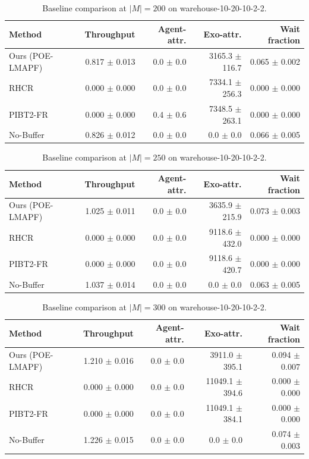\begin{table}[t]
\centering
\small
\begin{tabular}{lrrrr}
\toprule
Method & Throughput & Agent-attr. & Exo-attr. & Wait fraction \\
\midrule
Ours (POE-LMAPF) & 0.817 $\pm$ 0.013 & 0.0 $\pm$ 0.0 & 3165.3 $\pm$ 116.7 & 0.065 $\pm$ 0.002 \\
RHCR & 0.000 $\pm$ 0.000 & 0.0 $\pm$ 0.0 & 7334.1 $\pm$ 256.3 & 0.000 $\pm$ 0.000 \\
PIBT2-FR & 0.000 $\pm$ 0.000 & 0.4 $\pm$ 0.6 & 7348.5 $\pm$ 263.1 & 0.000 $\pm$ 0.000 \\
No-Buffer & 0.826 $\pm$ 0.012 & 0.0 $\pm$ 0.0 & 0.0 $\pm$ 0.0 & 0.066 $\pm$ 0.005 \\
\bottomrule
\end{tabular}
\caption{Baseline comparison at $|M|=200$ on warehouse-10-20-10-2-2.}
\label{tab:baselines_200}
\end{table}

\begin{table}[t]
\centering
\small
\begin{tabular}{lrrrr}
\toprule
Method & Throughput & Agent-attr. & Exo-attr. & Wait fraction \\
\midrule
Ours (POE-LMAPF) & 1.025 $\pm$ 0.011 & 0.0 $\pm$ 0.0 & 3635.9 $\pm$ 215.9 & 0.073 $\pm$ 0.003 \\
RHCR & 0.000 $\pm$ 0.000 & 0.0 $\pm$ 0.0 & 9118.6 $\pm$ 432.0 & 0.000 $\pm$ 0.000 \\
PIBT2-FR & 0.000 $\pm$ 0.000 & 0.0 $\pm$ 0.0 & 9118.6 $\pm$ 420.7 & 0.000 $\pm$ 0.000 \\
No-Buffer & 1.037 $\pm$ 0.014 & 0.0 $\pm$ 0.0 & 0.0 $\pm$ 0.0 & 0.063 $\pm$ 0.005 \\
\bottomrule
\end{tabular}
\caption{Baseline comparison at $|M|=250$ on warehouse-10-20-10-2-2.}
\label{tab:baselines_250}
\end{table}

\begin{table}[t]
\centering
\small
\begin{tabular}{lrrrr}
\toprule
Method & Throughput & Agent-attr. & Exo-attr. & Wait fraction \\
\midrule
Ours (POE-LMAPF) & 1.210 $\pm$ 0.016 & 0.0 $\pm$ 0.0 & 3911.0 $\pm$ 395.1 & 0.094 $\pm$ 0.007 \\
RHCR & 0.000 $\pm$ 0.000 & 0.0 $\pm$ 0.0 & 11049.1 $\pm$ 394.6 & 0.000 $\pm$ 0.000 \\
PIBT2-FR & 0.000 $\pm$ 0.000 & 0.0 $\pm$ 0.0 & 11049.1 $\pm$ 384.1 & 0.000 $\pm$ 0.000 \\
No-Buffer & 1.226 $\pm$ 0.015 & 0.0 $\pm$ 0.0 & 0.0 $\pm$ 0.0 & 0.074 $\pm$ 0.003 \\
\bottomrule
\end{tabular}
\caption{Baseline comparison at $|M|=300$ on warehouse-10-20-10-2-2.}
\label{tab:baselines_300}
\end{table}

